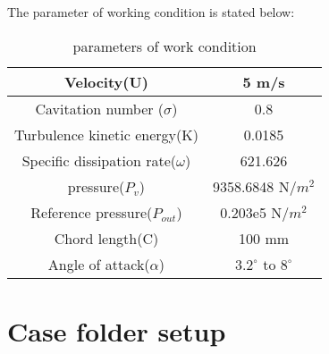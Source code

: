 The parameter of working condition is stated below:
\begin{table}[h]
    \centering
    \begin{tabular}{|c|c|}
    \hline
        Velocity(U) & 5 m/s \\
    \hline
        Cavitation number ($\sigma$) & 0.8 \\ 
    \hline
     Turbulence kinetic energy(K) & 0.0185 \\
    \hline
    Specific dissipation rate($\omega$) & 621.626 \\
    \hline
    pressure($P_v$) & 9358.6848 N/${m}^2$\\
    \hline
    Reference pressure($P_{out}$) &  0.203e5 N/${m}^2$ \\
    \hline
    Chord length(C) & 100 mm \\
    \hline
    Angle of attack($\alpha$) & ${3.2}^{\circ}$ to ${8}^{\circ}$ \\
   \hline
    \end{tabular}
    \caption{parameters of work condition}
    \label{tab:PC}
\end{table}

\section{Case folder setup}
